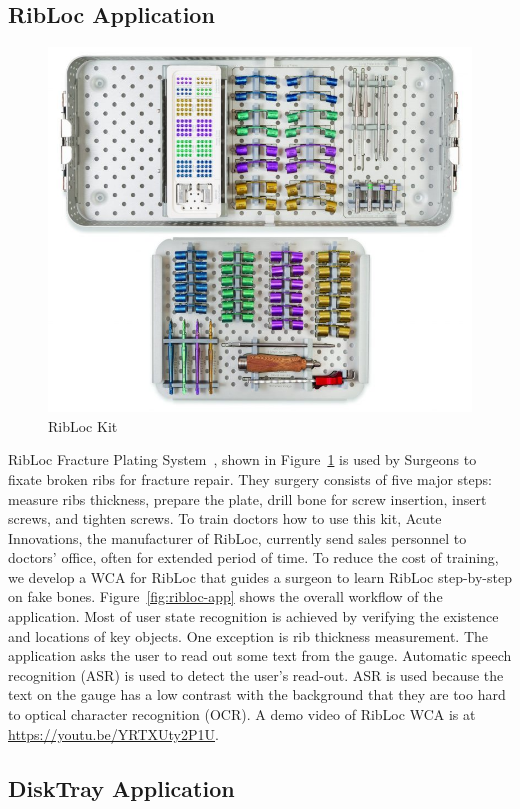 \subsection{RibLoc Application}

\begin{figure}
\centering
\includegraphics[width=0.5\linewidth]{FIGS/RibLoc.jpg}
\caption{\small RibLoc Kit}
\label{fig:ribloc}
\end{figure}

RibLoc Fracture Plating System~\cite{ribloc}, shown in Figure~\ref{fig:ribloc}
is used by Surgeons to fixate broken ribs for fracture repair. They surgery
consists of five major steps: measure ribs thickness, prepare the plate, drill
bone for screw insertion, insert screws, and tighten screws. To train doctors
how to use this kit, Acute Innovations, the manufacturer of RibLoc, currently
send sales personnel to doctors' office, often for extended period of time. To
reduce the cost of training, we develop a WCA for RibLoc that guides a surgeon
to learn RibLoc step-by-step on fake bones. Figure~\ref{fig:ribloc-app} shows
the overall workflow of the application. Most of user state recognition is
achieved by verifying the existence and locations of key objects. One exception
is rib thickness measurement. The application asks the user to read out some
text from the gauge. Automatic speech recognition (ASR) is used to detect the
user's read-out. ASR is used because the text on the gauge has a low contrast
with the background that they are too hard to optical character recognition
(OCR). A demo video of RibLoc WCA is at \url{https://youtu.be/YRTXUty2P1U}.

\subsection{DiskTray Application}


